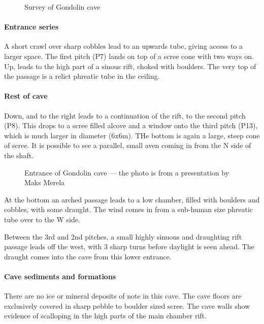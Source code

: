 \documentclass[symmetric, a4paper, 11pt]{article}
\begin{document}
\begin{wrapfigure}{r}{0.5\textwidth}
    
    \caption{Survey of Gondolin cave}
    \label{}
\end{wrapfigure}

\paragraph{Entrance series}
A short crawl over sharp cobbles lead to an upwards tube, giving access to a larger space. The first pitch (P7) lands on top of a scree cone with two ways on. Up, leads to the high part of a sinous rift, choked with boulders. The very top of the passage is a relict phreatic tube in the ceiling. 

\paragraph{Rest of cave}
Down, and to the right leads to a continuation of the rift, to the second pitch (P8). This drops to a scree filled alcove and a window onto the third pitch (P13), which is much larger in diameter (6x6m). THe bottom is again a large, steep cone of scree. It is possible to see a parallel, small aven coming in from the N side of the shaft. 
\begin{wrapfigure}{l}{0.5\textwidth}
    
    \caption{Entrance of Gondolin cave --- the photo is from a presentation by Maks Merela \cite{maks}}
    \label{ent}
\end{wrapfigure}
At the bottom an arched passage leads to a low chamber, filled with boulders and cobbles, with some draught. The wind comes in from a sub-human size phreatic tube over to the W side. 

Between the 3rd and 2nd pitches, a small highly sinuous and draughting rift passage leads off the west, with 3 sharp turns before daylight is seen ahead. The draught comes into the cave from this lower entrance.



\paragraph{Cave sediments and formations} 
There are no ice or mineral deposits of note in this cave. The cave floors are exclusively covered in sharp pebble to boulder sized scree. The cave walls show evidence of scalloping in the high parts of the main chamber rift.
\end{document}
